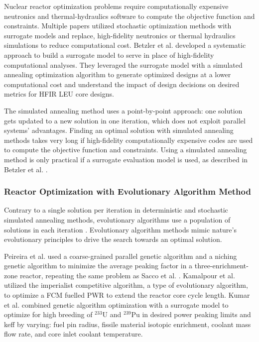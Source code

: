 Nuclear reactor optimization problems require computationally 
expensive neutronics and thermal-hydraulics software to compute the objective 
function and constraints. 
Multiple papers utilized stochastic optimization methods with surrogate models 
and replace, high-fidelity neutronics or thermal hydraulics 
simulations to reduce computational cost.
Betzler et al. \cite{betzler_design_2019} developed a systematic approach to 
build a surrogate model to serve in place of high-fidelity computational 
analyses. 
They leveraged the surrogate model with a simulated annealing optimization 
algorithm to generate optimized designs at a lower computational cost and
understand the impact of design decisions on desired metrics for \gls{HFIR} \gls{LEU} 
core designs.

The simulated annealing method uses a point-by-point approach:
one solution gets updated to a new solution in one iteration, which does not 
exploit parallel systems' advantages.
Finding an optimal solution with simulated annealing methods takes very 
long if high-fidelity computationally expensive codes are used to compute 
the objective function and constraints.
Using a simulated annealing method is only practical if a 
surrogate evaluation model is used, as described in Betzler et al. 
\cite{betzler_design_2019}.

\subsubsection{Reactor Optimization with Evolutionary Algorithm Method}
Contrary to a single solution per iteration in deterministic and stochastic 
simulated annealing methods, evolutionary algorithms use a population of 
solutions in each iteration \cite{deb_multi-objective_2001}. 
Evolutionary algorithm methods mimic nature's evolutionary principles to drive 
the search towards an optimal solution. 

Peireira et al. \cite{pereira_coarse-grained_2003,pereira_parallel_2008} 
used a coarse-grained parallel genetic algorithm and a niching genetic algorithm
to minimize the average peaking factor in a three-enrichment-zone reactor, 
repeating the same problem as Sacco et al. \cite{sacco_two_2006}. 
Kamalpour et al. \cite{kamalpour_smart_2020} utilized the imperialist competitive 
algorithm, a type of evolutionary algorithm, to optimize a \gls{FCM} fuelled 
\gls{PWR} to extend the reactor core cycle length. 
Kumar et al. \cite{kumar_new_2015} combined genetic algorithm optimization 
with a surrogate model to optimize for high breeding of $^{233}$U and $^{239}$Pu 
in desired power peaking limits and keff by varying: fuel pin 
radius,  fissile material isotopic enrichment, coolant mass flow rate, and 
core inlet coolant temperature.

